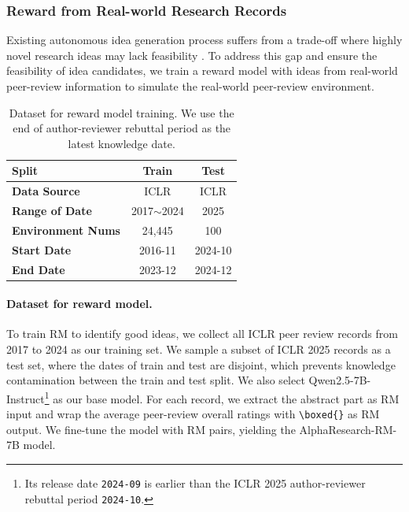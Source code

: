 \subsubsection{Reward from Real-world Research Records}
\label{sec:rm}
Existing autonomous idea generation process suffers from a trade-off where highly novel research ideas may lack feasibility \citep{guo2025ideabench, si2025ideation}. To address this gap and ensure the feasibility of idea candidates, we train a reward model with ideas from real-world peer-review information to simulate the real-world peer-review environment.

\begin{table}
\centering
\vspace{1.0\baselineskip}
\small
\setlength{\tabcolsep}{4pt}
\begin{tabular}{l|c|c}
\toprule
\textbf{Split} & \textbf{Train} & \textbf{Test} \\
\midrule
\textbf{Data Source} & ICLR & ICLR \\
\textbf{Range of Date} & 2017$\sim$2024 & 2025 \\
\textbf{Environment Nums} & 24,445 & 100 \\
\textbf{Start Date} & 2016-11 & 2024-10 \\
\textbf{End Date} & 2023-12 & 2024-12 \\
\bottomrule
\end{tabular}
\caption{Dataset for reward model training. We use the end of author-reviewer rebuttal period as the latest knowledge date.}
\label{tab:rmd}
\end{table}

\paragraph{Dataset for reward model.} 
To train RM to identify good ideas, we collect all ICLR peer review records from 2017 to 2024 as our training set. We sample a subset of ICLR 2025 records as a test set, where the dates of train and test are disjoint, which prevents knowledge contamination between the train and test split. We also select Qwen2.5-7B-Instruct\footnote{Its release date \texttt{2024-09} is earlier than the ICLR 2025 author-reviewer rebuttal period \texttt{2024-10}.} as our base model.
For each record, we extract the abstract part as RM input and wrap the average peer-review overall ratings with \texttt{\textbackslash boxed\{\}} as RM output. We fine-tune the model with RM pairs, yielding the AlphaResearch-RM-7B model. 


